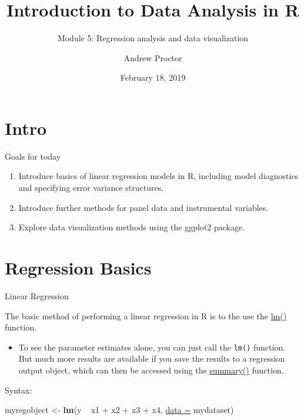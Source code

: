 \documentclass[ignorenonframetext,]{beamer}
\title{Introduction to Data Analysis in R}
\subtitle{Module 5: Regression analysis and data visualization}
\author{Andrew Proctor}
\institute{\href{mailto:andrew.proctor@phdstudent.hhs.se}{\nolinkurl{andrew.proctor@phdstudent.hhs.se}}}
\date{February 18, 2019}
\newenvironment{Shaded}{\begin{snugshade}}{\end{snugshade}}
\newcommand{\KeywordTok}[1]{\textcolor[rgb]{0.26,0.66,0.93}{\textbf{#1}}}
\newcommand{\DataTypeTok}[1]{\textcolor[rgb]{0.74,0.68,0.62}{\underline{#1}}}
\newcommand{\StringTok}[1]{\textcolor[rgb]{0.02,0.61,0.04}{#1}}
\newcommand{\OperatorTok}[1]{\textcolor[rgb]{0.74,0.68,0.62}{#1}}
\newcommand{\NormalTok}[1]{\textcolor[rgb]{0.74,0.68,0.62}{#1}}
\providecommand{\tightlist}{%
  \setlength{\itemsep}{0pt}\setlength{\parskip}{0pt}}
\begin{document}
\frame{\titlepage}

\begin{frame}
\tableofcontents[hideallsubsections]
\end{frame}

\section{Intro}\label{intro}

\begin{frame}{Goals for today}

\begin{enumerate}
\def\labelenumi{\arabic{enumi}.}
\tightlist
\item
  Introduce basics of linear regression models in R, including model
  diagnostics and specifying error variance structures.
\item
  Introduce further methods for panel data and instrumental variables.
\item
  Explore data visualization methods using the ggplot2 package.
\end{enumerate}

\end{frame}

\section{Regression Basics}\label{regression-basics}

\begin{frame}[fragile]{Linear Regression}

The basic method of performing a linear regression in R is to the use
the
\href{https://www.rdocumentation.org/packages/stats/versions/3.4.3/topics/lm}{lm()}
function.

\begin{itemize}
\tightlist
\item
  To see the parameter estimates alone, you can just call the
  \texttt{lm()} function. But much more results are available if you
  save the results to a regression output object, which can then be
  accessed using the
  \href{https://www.rdocumentation.org/packages/base/versions/3.4.3/topics/summary}{summary()}
  function.
\end{itemize}

Syntax:

\begin{Shaded}
\begin{Highlighting}[]
\NormalTok{myregobject <-}\StringTok{ }\KeywordTok{lm}\NormalTok{(y }\OperatorTok{~}\StringTok{ }\NormalTok{x1 }\OperatorTok{+}\StringTok{ }\NormalTok{x2 }\OperatorTok{+}\StringTok{ }\NormalTok{x3 }\OperatorTok{+}\StringTok{ }\NormalTok{x4, }
                  \DataTypeTok{data =}\NormalTok{ mydataset)}
\end{Highlighting}
\end{Shaded}

\end{frame}
\end{document}
